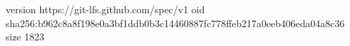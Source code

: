 version https://git-lfs.github.com/spec/v1
oid sha256:b962c8a8f198e0a3bf1ddb0b3c14460887fc778ffeb217a0eeb406eda04a8c36
size 1823
